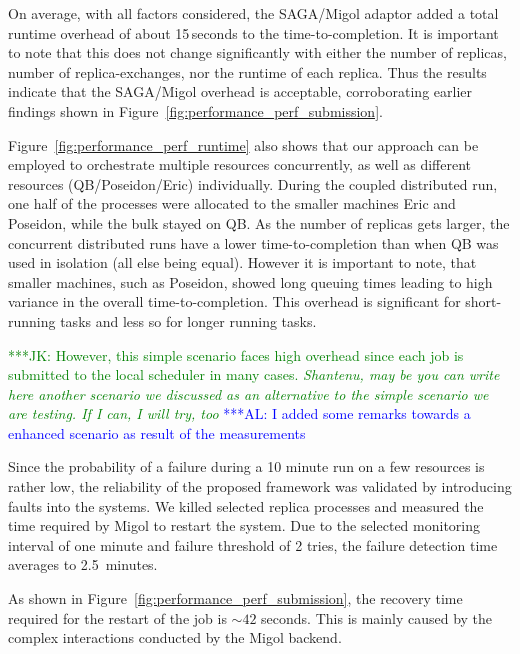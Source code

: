 \documentclass{rspublic}
\newcommand{\kimnote}[1]{ {\textcolor{green} { ***JK: #1 }}}
\newcommand{\alnote}[1]{ {\textcolor{blue} { ***AL: #1 }}}
\newcommand{\kimnote}[1]{}
\newcommand{\alnote}[1]{}
\begin{document}
On average, with all factors considered, the SAGA/Migol adaptor added
a total runtime overhead of about 15\,seconds to the
time-to-completion.  It is important to note that this does not change
significantly with either the number of replicas, number of
replica-exchanges, nor the runtime of each replica.  Thus the results
indicate that the SAGA/Migol overhead is acceptable, corroborating
earlier findings shown in
Figure~\ref{fig:performance_perf_submission}.

Figure~\ref{fig:performance_perf_runtime} also shows that our approach
can be employed to orchestrate multiple resources concurrently, as
well as different resources (QB/Poseidon/Eric) individually.  During
the coupled distributed run, one half of the processes were allocated to
the smaller machines Eric and Poseidon, while the bulk stayed on QB.  As the
number of replicas gets larger, the concurrent distributed runs have a
lower time-to-completion than when QB was used in isolation 
(all else being equal). However it is important to note, that
smaller machines, such as Poseidon, showed long queuing times leading
to high variance in the overall time-to-completion. This overhead is
significant for short-running tasks and less so for longer running
tasks. 

\kimnote{However, this simple scenario faces high overhead since each
  job is submitted to the local scheduler in many cases. \it Shantenu,
  may be you can write here another scenario we discussed as an
  alternative to the simple scenario we are testing.  If I can, I will
  try, too } \alnote{I added some remarks towards a enhanced scenario
  as result of the measurements}
  

Since the probability of a failure during a 10 minute run on a few
resources is rather low, the reliability of the proposed framework was
validated by introducing faults into the systems. We killed selected
replica processes and measured the time required by Migol to restart
the system.  Due to the selected monitoring interval of one minute and
failure threshold of 2 tries, the failure detection time averages to
2.5\, minutes.

As shown in Figure~\ref{fig:performance_perf_submission}, the recovery
time required for the restart of the job is $\sim42$ seconds. This is
mainly caused by the complex interactions conducted by the Migol
backend.
\end{document}
